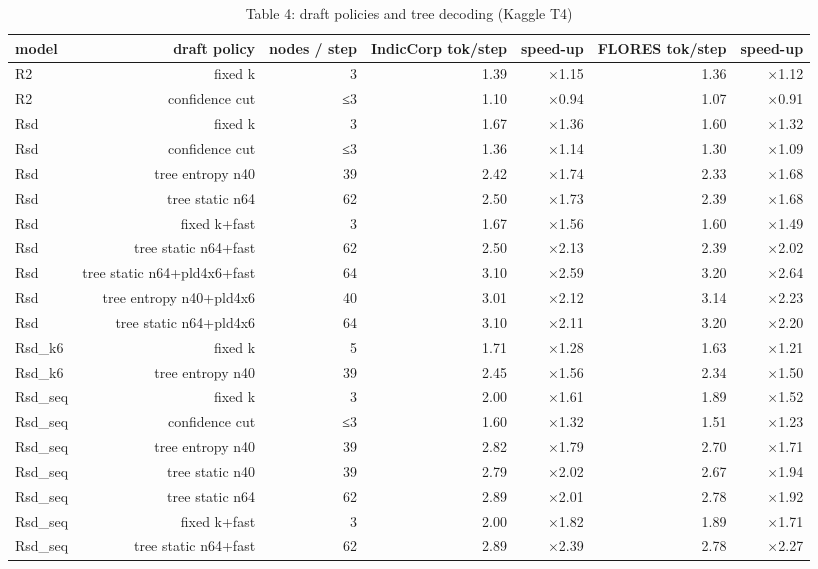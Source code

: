 \begin{table}[t]
\centering
\small
\caption{Table 4: draft policies and tree decoding (Kaggle T4)}
\label{tab:table4_decoding}
\begin{tabular}{lrrrrrr}
\toprule
model & draft policy & nodes / step & IndicCorp tok/step & speed-up & FLORES tok/step & speed-up \\
\midrule
R2 & fixed k & 3 & 1.39 & $\times$1.15 & 1.36 & $\times$1.12 \\
R2 & confidence cut & ≤3 & 1.10 & $\times$0.94 & 1.07 & $\times$0.91 \\
Rsd & fixed k & 3 & 1.67 & $\times$1.36 & 1.60 & $\times$1.32 \\
Rsd & confidence cut & ≤3 & 1.36 & $\times$1.14 & 1.30 & $\times$1.09 \\
Rsd & tree entropy n40 & 39 & 2.42 & $\times$1.74 & 2.33 & $\times$1.68 \\
Rsd & tree static n64 & 62 & 2.50 & $\times$1.73 & 2.39 & $\times$1.68 \\
Rsd & fixed k+fast & 3 & 1.67 & $\times$1.56 & 1.60 & $\times$1.49 \\
Rsd & tree static n64+fast & 62 & 2.50 & $\times$2.13 & 2.39 & $\times$2.02 \\
Rsd & tree static n64+pld4x6+fast & 64 & 3.10 & $\times$2.59 & 3.20 & $\times$2.64 \\
Rsd & tree entropy n40+pld4x6 & 40 & 3.01 & $\times$2.12 & 3.14 & $\times$2.23 \\
Rsd & tree static n64+pld4x6 & 64 & 3.10 & $\times$2.11 & 3.20 & $\times$2.20 \\
Rsd\_k6 & fixed k & 5 & 1.71 & $\times$1.28 & 1.63 & $\times$1.21 \\
Rsd\_k6 & tree entropy n40 & 39 & 2.45 & $\times$1.56 & 2.34 & $\times$1.50 \\
Rsd\_seq & fixed k & 3 & 2.00 & $\times$1.61 & 1.89 & $\times$1.52 \\
Rsd\_seq & confidence cut & ≤3 & 1.60 & $\times$1.32 & 1.51 & $\times$1.23 \\
Rsd\_seq & tree entropy n40 & 39 & 2.82 & $\times$1.79 & 2.70 & $\times$1.71 \\
Rsd\_seq & tree static n40 & 39 & 2.79 & $\times$2.02 & 2.67 & $\times$1.94 \\
Rsd\_seq & tree static n64 & 62 & 2.89 & $\times$2.01 & 2.78 & $\times$1.92 \\
Rsd\_seq & fixed k+fast & 3 & 2.00 & $\times$1.82 & 1.89 & $\times$1.71 \\
Rsd\_seq & tree static n64+fast & 62 & 2.89 & $\times$2.39 & 2.78 & $\times$2.27 \\

\end{tabular}
\end{table}
